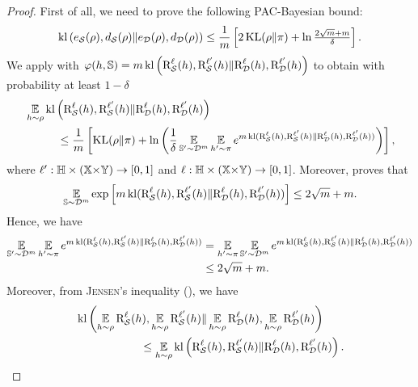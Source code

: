 \begin{noaddcontents}
\theoremcboundlacasse*
\begin{proof}
First of all, we need to prove the following PAC-Bayesian bound: 
\begin{align}
    \operatorname{kl}\left( e_{\mathcal{S}}(\rho),  d_{\mathcal{S}}(\rho)\|e_{\mathcal{D}}(\rho),  d_{\mathcal{D}}(\rho)\right) \le \frac{1}{m}\left[ 2\operatorname{KL}(\rho\|\pi) + \ln\tfrac{2\sqrt{m}+m}{\delta}\right].\label{chap:mv:eq:cbound-lacasse-proof-1}
\end{align}
We apply  with $\varphi(h,\mathbb{S})=m\operatorname{kl}\left(\text{R}^{\ell}_{\mathcal{S}}(h),\text{R}^{\ell'}_{\mathcal{S}}(h)\|\text{R}^{\ell}_{\mathcal{D}}(h), \text{R}^{\ell'}_{\mathcal{D}}(h)\right)$ to obtain with probability at least $1-\delta$
\begin{align}
    &\operatorname*{\mathbb{E}}_{h\sim\rho}\operatorname{kl}\left(\text{R}^{\ell}_{\mathcal{S}}(h),\text{R}^{\ell'}_{\mathcal{S}}(h)\|\text{R}^{\ell}_{\mathcal{D}}(h), \text{R}^{\ell'}_{\mathcal{D}}(h)\right)\nonumber\\
    &\hspace{1cm} \le \frac{1}{m}\left[\operatorname{KL}(\rho\|\pi) + \ln\left(\frac{1}{\delta}\operatorname*{\mathbb{E}}_{\mathbb{S}'\sim\mathcal{D}^m}\operatorname*{\mathbb{E}}_{h'\sim\pi}e^{m\operatorname{kl}(\text{R}^{\ell}_{\mathcal{S}}(h),\text{R}^{\ell'}_{\mathcal{S}}(h)\|\text{R}^{\ell}_{\mathcal{D}}(h), \text{R}^{\ell'}_{\mathcal{D}}(h))}\right)\right],\label{chap:mv:eq:cbound-lacasse-proof-2}
\end{align}
where $\ell':\mathbb{H}\times(\mathbb{X}{\times}\mathbb{Y})\to[0,1]$ and $\ell:\mathbb{H}\times(\mathbb{X}{\times}\mathbb{Y})\to[0,1]$.
Moreover, \citet{Younsi2012,YounsiLacasse2020} proves that
\begin{align*}
\operatorname*{\mathbb{E}}_{\mathbb{S}\sim\mathcal{D}^m}\exp\left[m\operatorname{kl}(\text{R}^{\ell}_{\mathcal{S}}(h),\text{R}^{\ell'}_{\mathcal{S}}(h)\|\text{R}^{\ell}_{\mathcal{D}}(h), \text{R}^{\ell'}_{\mathcal{D}}(h))\right] \le 2\sqrt{m}+m.
\end{align*}
Hence, we have 
\begin{align}
    \operatorname*{\mathbb{E}}_{\mathbb{S}'\sim\mathcal{D}^m}\operatorname*{\mathbb{E}}_{h'\sim\pi}e^{m\operatorname{kl}(\text{R}^{\ell}_{\mathcal{S}}(h),\text{R}^{\ell'}_{\mathcal{S}}(h)\|\text{R}^{\ell}_{\mathcal{D}}(h), \text{R}^{\ell'}_{\mathcal{D}}(h))} &= \operatorname*{\mathbb{E}}_{h'\sim\pi}\operatorname*{\mathbb{E}}_{\mathbb{S}'\sim\mathcal{D}^m}e^{m\operatorname{kl}(\text{R}^{\ell}_{\mathcal{S}}(h),\text{R}^{\ell'}_{\mathcal{S}}(h)\|\text{R}^{\ell}_{\mathcal{D}}(h), \text{R}^{\ell'}_{\mathcal{D}}(h))}\nonumber\\
    &\le 2\sqrt{m}+m.\label{chap:mv:eq:cbound-lacasse-proof-3}
\end{align}
Moreover, from \textsc{Jensen}'s inequality (), we have
\begin{align}
    &\kl\LP\EE_{\h\sim\Q}\RiskLoss_{\dS}(\h),\EE_{\h\sim\Q}\RiskLossp_{\dS}(\h)\|\EE_{\h\sim\Q}\RiskLoss_{\D}(\h), \EE_{\h\sim\Q}\RiskLossp_{\D}(\h)\RP\nonumber\\
    &\hspace{2cm}\le \EE_{\h\sim\Q}\kl\LP\RiskLoss_{\dS}(\h),\RiskLossp_{\dS}(\h)\|\RiskLoss_{\D}(\h), \RiskLossp_{\D}(\h)\RP.\label{chap:mv:eq:cbound-lacasse-proof-4}

\end{align}
\end{proof}
\end{noaddcontents}
